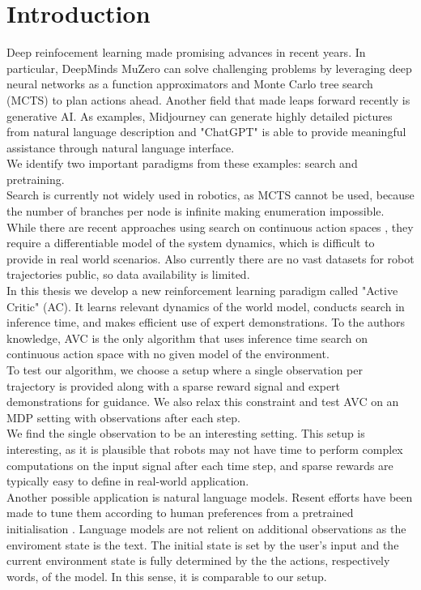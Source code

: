 \chapter{Introduction}
\label{chapter:Introduction}
Deep reinfocement learning made promising advances in recent years. In particular, DeepMinds MuZero \cite{MUZero} can solve challenging problems by leveraging deep neural networks as a function 
approximators and Monte Carlo tree search (MCTS) to plan actions ahead. 
Another field that made leaps forward recently is generative AI. As examples, Midjourney \cite{midjourney} 
can generate highly detailed pictures from natural 
language description and "ChatGPT" is able to provide meaningful assistance through natural language interface. \\
We identify two important paradigms from these examples: search and pretraining. \\
Search is currently not widely used in robotics, as MCTS cannot be used, because the number of branches per node is infinite making enumeration impossible. While there are recent approaches 
using search on continuous action spaces \cite{Manna2022} \cite{Lee_Jeon_Kim_Kim_2020}, they require a differentiable model of the system dynamics, which is difficult to provide in real world scenarios. 
Also currently there are no vast datasets for robot trajectories public, so data availability is limited.\\ 
In this thesis we develop a new reinforcement learning 
paradigm called "Active Critic" (AC). It learns relevant dynamics of the world model, conducts search in inference time, and makes efficient use of expert demonstrations. 
To the authors knowledge, AVC is the only algorithm that uses inference time search on continuous action space with no given model of the environment.\\
To test our algorithm, we choose a setup where a single observation per trajectory is provided along with a sparse reward signal and expert demonstrations for guidance. 
We also relax this constraint and test AVC on an MDP setting with observations after each step.\\

We find the single observation to be an interesting setting. This setup is interesting, as it is plausible that robots may not have time to perform complex computations 
on the input signal after each time step, and sparse rewards are typically easy to define in real-world application.\\
Another possible application is natural language models. Resent efforts have been made to tune 
them according to human preferences from a pretrained initialisation \cite{cite:ChatGPT}. Language models are not relient on additional observations as the enviroment state is the 
text. The initial state is set by the user's input and the current environment state is fully determined by the the actions, respectively words, of the model. 
In this sense, it is comparable to our setup.\\


